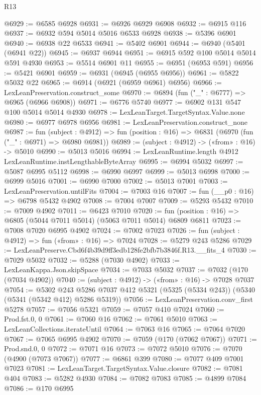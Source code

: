 \begin{lexlean}{R13}
\begin{coremodule}
@6929 := @6585 @6928
@6931 := @6926 @6929 @6908
@6932 := @6915 @116
@6937 := @6932 @594 @5014 @5016 @6533 @6928
@6938 := @5396 @6901
@6940 := @6938 @22 @6533
@6941 := @5402 @6901
@6944 := @6940 (@5401 (@6941 @22))
@6945 := @6937 @6944
@6951 := @6915 @592 @100 @5014 @5014 @591 @4930
@6953 := @5514 @6901 @11
@6955 := @6951 (@6953 @591)
@6956 := @5421 @6901
@6959 := @6931 (@6945 (@6955 @6956))
@6961 := @5822 @5032 @22
@6965 := @6914 (@6921 (@6959 @6961) @6956)
@6966 := LexLeanPreservation.construct_some
@6970 := @6894 (fun ("_" : @6777) => @6965 (@6966 @6908))
@6971 := @6776 @5740
@6977 := @6902 @131 @547 @100 @5014 @5014 @4930
@6978 := LexLeanTarget.TargetSyntax.Value.none
@6980 := @6977 @6978 @6956
@6981 := LexLeanPreservation.construct_none
@6987 := fun (subject : @4912) =>
  fun (position : @16) => @6831 (@6970 (fun ("_" : @6971) => @6980 @6981))
@6989 := (subject : @4912) -> («from» : @16) -> @5010
@6990 := @5013 @5016
@6994 := LexLeanRuntime.length @4912 LexLeanRuntime.instLengthableByteArray
@6995 := @6994 @5032
@6997 := @5087 @6995 @5112
@6998 := @6990 @6997
@6999 := @5013 @6998
@7000 := @6999 @5016
@7001 := @6990 @7000
@7002 := @5013 @7001
@7003 := LexLeanPreservation.untilFits
@7004 := @7003 @16
@7007 := fun (__p0 : @16) => @6798 @5432 @4902
@7008 := @7004 @7007
@7009 := @5293 @5432
@7010 := @7009 @4902
@7011 := @6423 @7010
@7020 := fun (position : @16) => @6805 (@5044 @7011 @5014) (@5063 @7011 @5014) @6809 @6811
@7023 := @7008 @7020 @6995 @4902
@7024 := @7002 @7023
@7026 := fun (subject : @4912) => fun («from» : @16) => @7024
@7028 := @5279 @243 @5286
@7029 := LexLeanPreserve.Cbd6f4b39d9ff3edb128fe2bfb7b3846f.R13.__fits_4
@7030 := @7029 @5032
@7032 := @5288 (@7030 @4902)
@7033 := LexLeanKappa.Json.skipSpace
@7034 := @7033 @5032
@7037 := @7032 (@170 (@7034 @4902))
@7040 := (subject : @4912) -> («from» : @16) -> @7028 @7037
@7054 := @5302
    @243
    @5286
    @7037
    @412
    @5321
    (@5325 (@5334 @243))
    (@5340 (@5341 (@5342 @412) @5286 @5319))
@7056 := LexLeanPreservation.conv_first @5278
@7057 := @7056 @5321
@7059 := @7057 @410 @7024
@7060 := Prod.fst.{0, 0}
@7061 := @7060 @16
@7062 := @7061 @5010
@7063 := LexLeanCollections.iterateUntil
@7064 := @7063 @16
@7065 := @7064 @7020
@7067 := @7065 @6995 @4902
@7070 := @7059 (@170 (@7062 @7067))
@7071 := Prod.snd.{0, 0}
@7072 := @7071 @16
@7073 := @7072 @5010
@7076 := @7070 (@4900 (@7073 @7067))
@7077 := @6861 @399
@7080 := @7077 @409 @7001 @7023
@7081 := LexLeanTarget.TargetSyntax.Value.closure
@7082 := @7081 @404
@7083 := @5282 @4930
@7084 := @7082 @7083
@7085 := @4899 @7084
@7086 := @170 @6995

\end{coremodule}
\end{lexlean}
